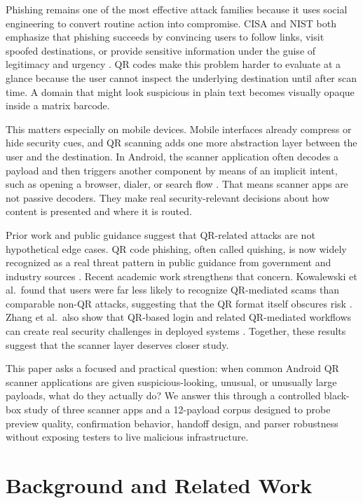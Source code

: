 \documentclass[11pt]{article}
\begin{document}
Phishing remains one of the most effective attack families because it uses social engineering to convert routine action into compromise. CISA and NIST both emphasize that phishing succeeds by convincing users to follow links, visit spoofed destinations, or provide sensitive information under the guise of legitimacy and urgency \cite{cisa-phishing,nist-phishing}. QR codes make this problem harder to evaluate at a glance because the user cannot inspect the underlying destination until after scan time. A domain that might look suspicious in plain text becomes visually opaque inside a matrix barcode.

This matters especially on mobile devices. Mobile interfaces already compress or hide security cues, and QR scanning adds one more abstraction layer between the user and the destination. In Android, the scanner application often decodes a payload and then triggers another component by means of an implicit intent, such as opening a browser, dialer, or search flow \cite{android-intents,android-common-app-intents}. That means scanner apps are not passive decoders. They make real security-relevant decisions about how content is presented and where it is routed.

Prior work and public guidance suggest that QR-related attacks are not hypothetical edge cases. QR code phishing, often called quishing, is now widely recognized as a real threat pattern in public guidance from government and industry sources \cite{aha-quishing,uspis-quishing}. Recent academic work strengthens that concern. Kowalewski et al.\ found that users were far less likely to recognize QR-mediated scams than comparable non-QR attacks, suggesting that the QR format itself obscures risk \cite{usenix-qr}. Zhang et al.\ also show that QR-based login and related QR-mediated workflows can create real security challenges in deployed systems \cite{usenix-qrlogin}. Together, these results suggest that the scanner layer deserves closer study.

This paper asks a focused and practical question: when common Android QR scanner applications are given suspicious-looking, unusual, or unusually large payloads, what do they actually do? We answer this through a controlled black-box study of three scanner apps and a 12-payload corpus designed to probe preview quality, confirmation behavior, handoff design, and parser robustness without exposing testers to live malicious infrastructure.

\section{Background and Related Work}
\end{document}
